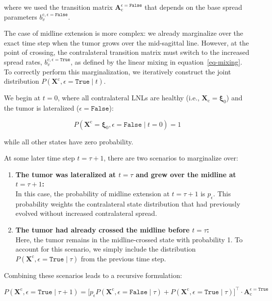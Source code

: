 \documentclass[
  sn-mathphys-num,
]{sn-jnl}
\begin{document}
where we used the transition matrix
\(\mathbf{A}_\text{c}^{\epsilon=\texttt{False}}\) that depends on the
base spread parameters \(b_v^{\text{c},\epsilon=\texttt{False}}\).

The case of midline extension is more complex: we already marginalize
over the exact time step when the tumor grows over the mid-sagittal
line. However, at the point of crossing, the contralateral transition
matrix must switch to the increased spread rates,
\(b_v^{\text{c}, \epsilon=\texttt{True}}\), as defined by the linear
mixing in equation~\ref{eq-mixing}. To correctly perform this
marginalization, we iteratively construct the joint distribution
\(P \left( \mathbf{X}^\text{c}, \epsilon=\texttt{True} \mid t \right)\).

We begin at \(t=0\), where all contralateral LNLs are healthy (i.e.,
\(\mathbf{X}_\text{c}=\boldsymbol{\xi}_0\)) and the tumor is lateralized
(\(\epsilon=\texttt{False}\)):

\[
P \left( \mathbf{X}^\text{c} = \boldsymbol{\xi}_0, \epsilon=\texttt{False} \mid t=0 \right) = 1
\]

while all other states have zero probability.

At some later time step \(t=\tau+1\), there are two scenarios to
marginalize over:

\begin{enumerate}
\def\labelenumi{\arabic{enumi}.}
\item
  \textbf{The tumor was lateralized at \(t=\tau\) and grew over the
  midline at \(t=\tau+1\):}\\
  In this case, the probability of midline extension at \(t=\tau+1\) is
  \(p_\epsilon\). This probability weights the contralateral state
  distribution that had previously evolved without increased
  contralateral spread.
\item
  \textbf{The tumor had already crossed the midline before
  \(t=\tau\):}\\
  Here, the tumor remains in the midline-crossed state with probability
  1. To account for this scenario, we simply include the distribution
  \(P\left( \mathbf{X}^\text{c}, \epsilon=\texttt{True} \mid \tau \right)\)
  from the previous time step.
\end{enumerate}

Combining these scenarios leads to a recursive formulation:

\[
P \left( \mathbf{X}^\text{c}, \epsilon=\texttt{True} \mid \tau + 1 \right) = \big[ p_\epsilon P \left( \mathbf{X}^\text{c}, \epsilon=\texttt{False} \mid \tau \right) + P \left( \mathbf{X}^\text{c}, \epsilon=\texttt{True} \mid \tau \right) \big]^\top \cdot \mathbf{A}_\text{c}^{\epsilon=\texttt{True}}
\]
\end{document}
